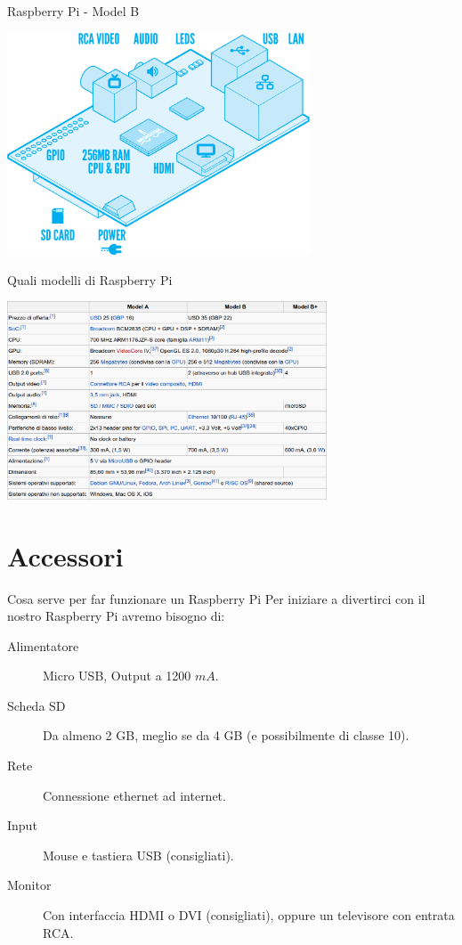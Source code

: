\documentclass[xcolor=svgnames,11pt]{beamer}
\begin{document}
\begin{frame}{Raspberry Pi - Model B}
\begin{center}
\includegraphics[width=9cm]{scheme.png}
\end{center}
\end{frame}

\begin{frame}{Quali modelli di Raspberry Pi}
\begin{center}
\includegraphics[width=9.5cm]{table.png}
\end{center}
\end{frame}

\section{Accessori}

\begin{frame}{Cosa serve per far funzionare un Raspberry Pi}
Per iniziare a divertirci con il nostro Raspberry Pi avremo bisogno di:
\pause
\begin{description}
\item[{\color{green_raspi} Alimentatore}] Micro USB, Output a 1200 $mA$.
\pause
\item[{\color{green_raspi} Scheda SD}] Da almeno 2 GB, meglio se da 4 GB (e possibilmente di classe 10).
\pause
\item[{\color{green_raspi} Rete}] Connessione ethernet ad internet.
\pause
\item[{\color{green_raspi} Input}] Mouse e tastiera USB (consigliati).
\pause
\item[{\color{green_raspi} Monitor}] Con interfaccia HDMI o DVI (consigliati), oppure un televisore con entrata RCA.
\end{description}
\end{frame}
\end{document}
